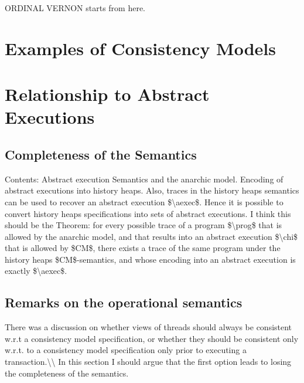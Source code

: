 \documentclass[acmsmall,review,anonymous]{acmart}\settopmatter{printfolios=true,printccs=false,printacmref=false}
\begin{document}
\newcommand{\RootPath}{..}


%
%
%
%
%
\ac{ORDINAL VERNON starts from here.}


\section{Examples of Consistency Models}

%
%

\section{Relationship to Abstract Executions}


\subsection{Completeness of the Semantics} 
\ac{Contents: Abstract execution Semantics and the anarchic model. 
Encoding of abstract executions into history heaps. Also, 
traces in the history heaps semantics can be used to recover 
an abstract execution $\aexec$. Hence it is possible to convert history heaps 
specifications into sets of abstract executions.
I think this should be the Theorem: for every possible trace of a program $\prog$ that is allowed by the anarchic 
model, and that results into an abstract execution $\chi$ that is allowed by $CM$, there 
exists a trace of the same program under the history heaps $CM$-semantics, 
and whose encoding into an abstract execution is exactly $\aexec$.}
\subsection{Remarks on the operational semantics}
\ac{There was a discussion on whether views of threads should always be consistent w.r.t a 
consistency model specification, or whether they should be consistent only w.r.t. to 
a consistency model specification only prior to executing a transaction.\\ 
In this section I should argue that the first option leads to losing the completeness of the 
semantics.}
\end{document}
